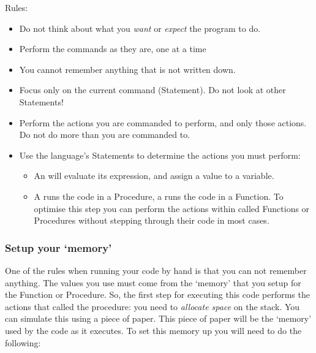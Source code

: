 Rules:
\begin{itemize}
  \item Do not think about what you \emph{want} or \emph{expect} the program to do.
  \item Perform the commands as they are, one at a time
  \item You cannot remember anything that is not written down.
  \item Focus only on the current command (Statement). Do not look at other Statements!
  \item Perform the actions you are commanded to perform, and only those actions. Do not do more than you are commanded to.
  \item Use the language's Statements to determine the actions you must perform:
  \begin{itemize}
    \item An  will evaluate its expression, and assign a value to a variable.
    \item A  runs the code in a Procedure, a  runs the code in a Function. To optimise this step you can perform the actions within called Functions or Procedures without stepping through their code in most cases.
  \end{itemize}
\end{itemize}


\clearpage
\subsubsection{Setup your `memory'} %
\label{ssub:setup_your_memory}

One of the rules when running your code by hand is that you can not remember anything. The values you use must come from the `memory' that you setup for the Function or Procedure. So, the first step for executing this code performs the actions that called the procedure: you need to \emph{allocate space} on the stack. You can simulate this using a piece of paper. This piece of paper will be the `memory' used by the code as it executes. To set this memory up you will need to do the following:

